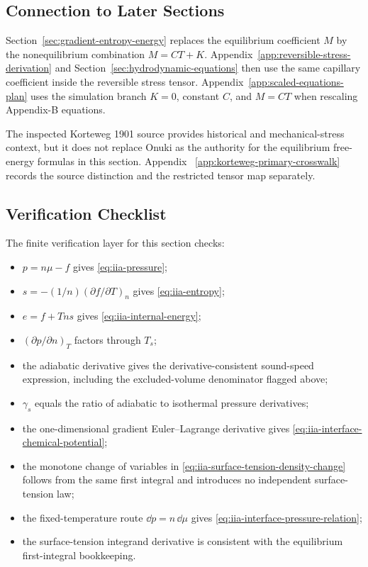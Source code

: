 \subsection{Connection to Later Sections}

Section~\ref{sec:gradient-entropy-energy} replaces the equilibrium coefficient
\(M\) by the nonequilibrium combination \(M=CT+K\).  Appendix~\ref{app:reversible-stress-derivation}
and Section~\ref{sec:hydrodynamic-equations} then use the same capillary
coefficient inside the reversible stress tensor.  Appendix~\ref{app:scaled-equations-plan}
uses the simulation branch \(K=0\), constant \(C\), and \(M=CT\) when rescaling
Appendix-B equations.

The inspected Korteweg 1901 source provides historical and mechanical-stress
context, but it does not replace Onuki as the authority for the equilibrium
free-energy formulas in this section.  Appendix~
\ref{app:korteweg-primary-crosswalk} records the source distinction and the
restricted tensor map separately.

\subsection{Verification Checklist}

The finite verification layer for this section checks:

\begin{itemize}
\item \(p=n\mu-f\) gives \eqref{eq:iia-pressure};
\item \(s=-(1/n)(\partial f/\partial T)_n\) gives \eqref{eq:iia-entropy};
\item \(e=f+Tns\) gives \eqref{eq:iia-internal-energy};
\item \((\partial p/\partial n)_T\) factors through \(T_s\);
\item the adiabatic derivative gives the derivative-consistent sound-speed
  expression, including the excluded-volume denominator flagged above;
\item \(\gamma_s\) equals the ratio of adiabatic to isothermal pressure
  derivatives;
\item the one-dimensional gradient Euler--Lagrange derivative gives
  \eqref{eq:iia-interface-chemical-potential};
\item the monotone change of variables in
  \eqref{eq:iia-surface-tension-density-change} follows from the same first
  integral and introduces no independent surface-tension law;
\item the fixed-temperature route \(\dd p=n\,\dd\mu\) gives
  \eqref{eq:iia-interface-pressure-relation};
\item the surface-tension integrand derivative is consistent with the
  equilibrium first-integral bookkeeping.
\end{itemize}

